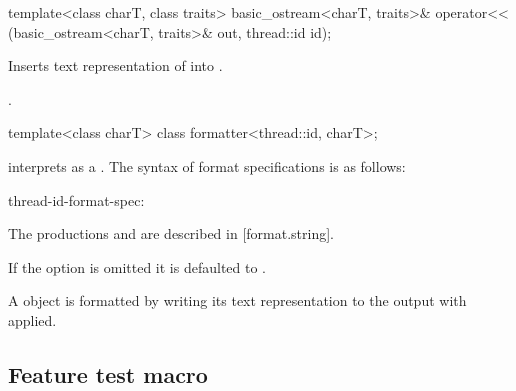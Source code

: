 \documentclass{wg21}
\begin{document}
%
\begin{itemdecl}
    template<class charT, class traits>
    basic_ostream<charT, traits>&
    operator<< (basic_ostream<charT, traits>& out, thread::id id);
\end{itemdecl}

\begin{itemdescr}
    \pnum
    \effects
    Inserts  text representation of  into
    . 

    \pnum
    \returns
    .
\end{itemdescr}

\begin{addedblock}

\begin{itemdecl}
template<class charT>
class formatter<thread::id, charT>;
\end{itemdecl}

\begin{itemdescr}
 interprets  as a . The syntax of format specifications is as follows:

\begin{bnf}
thread-id-format-spec:\br
{} 	
\end{bnf}

\begin{note}
    The productions  and  are described in [format.string].
\end{note}

If the  option is omitted it is defaulted to \tcode{>}.

A  object is formatted by writing its text representation to the output with  applied.
\end{itemdescr}

\end{addedblock}

\subsection{Feature test macro}
\end{document}
